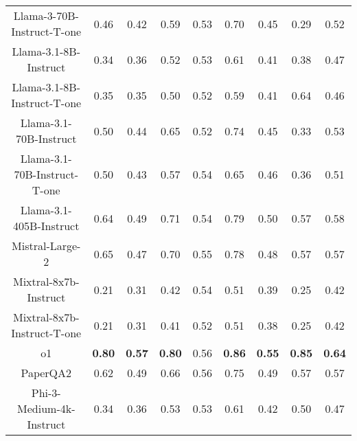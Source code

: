 \begin{tabular}{ccccccccc}
Llama-3-70B-Instruct-T-one & 0.46 & 0.42 & 0.59 & 0.53 & 0.70 & 0.45 & 0.29 & 0.52 \\
Llama-3.1-8B-Instruct & 0.34 & 0.36 & 0.52 & 0.53 & 0.61 & 0.41 & 0.38 & 0.47 \\
Llama-3.1-8B-Instruct-T-one & 0.35 & 0.35 & 0.50 & 0.52 & 0.59 & 0.41 & 0.64 & 0.46 \\
Llama-3.1-70B-Instruct & 0.50 & 0.44 & 0.65 & 0.52 & 0.74 & 0.45 & 0.33 & 0.53 \\
Llama-3.1-70B-Instruct-T-one & 0.50 & 0.43 & 0.57 & 0.54 & 0.65 & 0.46 & 0.36 & 0.51 \\
Llama-3.1-405B-Instruct & 0.64 & 0.49 & 0.71 & 0.54 & 0.79 & 0.50 & 0.57 & 0.58 \\
Mistral-Large-2 & 0.65 & 0.47 & 0.70 & 0.55 & 0.78 & 0.48 & 0.57 & 0.57 \\
Mixtral-8x7b-Instruct & 0.21 & 0.31 & 0.42 & 0.54 & 0.51 & 0.39 & 0.25 & 0.42 \\
Mixtral-8x7b-Instruct-T-one & 0.21 & 0.31 & 0.41 & 0.52 & 0.51 & 0.38 & 0.25 & 0.42 \\
o1 & \textbf{0.80} & \textbf{0.57} & \textbf{0.80} & 0.56 & \textbf{0.86} & \textbf{0.55} & \textbf{0.85} & \textbf{0.64} \\
PaperQA2 & 0.62 & 0.49 & 0.66 & 0.56 & 0.75 & 0.49 & 0.57 & 0.57 \\
Phi-3-Medium-4k-Instruct & 0.34 & 0.36 & 0.53 & 0.53 & 0.61 & 0.42 & 0.50 & 0.47 \\
\bottomrule
\end{tabular}
